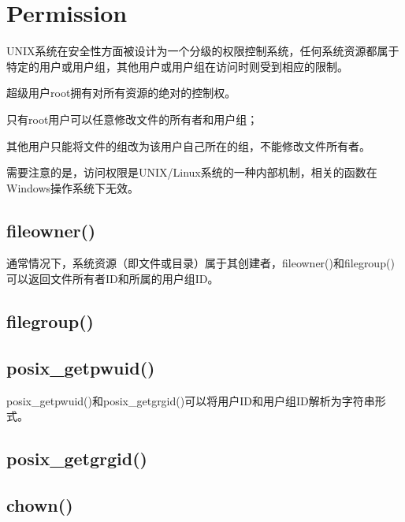 \section{Permission}


UNIX系统在安全性方面被设计为一个分级的权限控制系统，任何系统资源都属于特定的用户或用户组，其他用户或用户组在访问时则受到相应的限制。

超级用户root拥有对所有资源的绝对的控制权。

\begin{compactitem}
\item 只有root用户可以任意修改文件的所有者和用户组；
\item 其他用户只能将文件的组改为该用户自己所在的组，不能修改文件所有者。
\end{compactitem}

需要注意的是，访问权限是UNIX/Linux系统的一种内部机制，相关的函数在Windows操作系统下无效。


\subsection{fileowner()}

通常情况下，系统资源（即文件或目录）属于其创建者，fileowner()和filegroup()可以返回文件所有者ID和所属的用户组ID。




\subsection{filegroup()}



\subsection{posix\_getpwuid()}

posix\_getpwuid()和posix\_getgrgid()可以将用户ID和用户组ID解析为字符串形式。


\subsection{posix\_getgrgid()}



\subsection{chown()}





